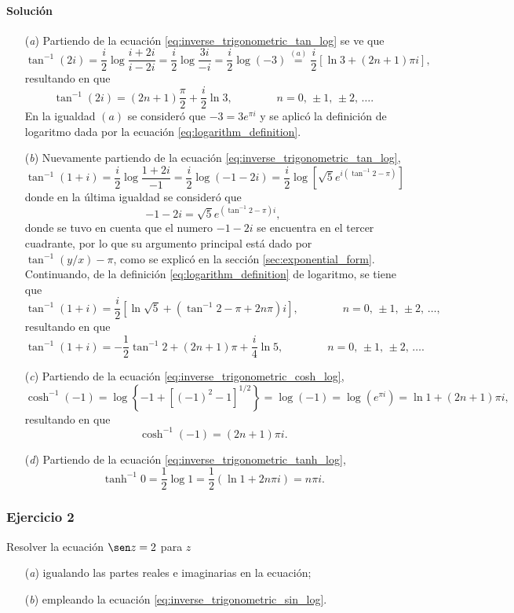\documentclass[a4paper]{report}
\begin{document}
\paragraph{Solución} 
\begin{enumerate}
 \item[(\textit{a})] Partiendo de la ecuación \ref{eq:inverse_trigonometric_tan_log} se ve que 
 \[
  \tan^{-1}(2i)=\frac{i}{2}\log\frac{i+2i}{i-2i}=\frac{i}{2}\log\frac{3i}{-i}
  =\frac{i}{2}\log(-3)\overset{(a)}{=}\frac{i}{2}\left[\ln3+(2n+1)\pi i\right],
 \]
 resultando en que 
 \[
  \tan^{-1}(2i)=(2n+1)\frac{\pi}{2}+\frac{i}{2}\ln3,
  \qquad\qquad
  n=0,\,\pm1,\,\pm2,\,\dots.
 \]
 En la igualdad \((a)\) se consideró que \(-3=3e^{\pi i}\) y se aplicó la definición de logaritmo dada por la ecuación \ref{eq:logarithm_definition}.
 \item[(\textit{b})] Nuevamente partiendo de la ecuación \ref{eq:inverse_trigonometric_tan_log},
 \[
  \tan^{-1}(1+i)=\frac{i}{2}\log\frac{1+2i}{-1}=\frac{i}{2}\log(-1-2i)
  =\frac{i}{2}\log\left[\sqrt{5}e^{i(\tan^{-1}2-\pi)}\right]
 \]
 donde en la última igualdad se consideró que 
 \[
  -1-2i=\sqrt{5}e^{(\tan^{-1}2-\pi)i},
 \]
 donde se tuvo en cuenta que el numero \(-1-2i\) se encuentra en el tercer cuadrante, por lo que su argumento principal está dado por \(\tan^{-1}(y/x)-\pi\), como se explicó en la sección \ref{sec:exponential_form}. Continuando, de la definición \ref{eq:logarithm_definition} de logaritmo, se tiene que 
 \[
  \tan^{-1}(1+i)=\frac{i}{2}\left[\ln\sqrt{5}+(\tan^{-1}2-\pi+2n\pi)i\right],
  \qquad\qquad
  n=0,\,\pm1,\,\pm2,\,\dots,
 \]
 resultando en que 
 \[
  \tan^{-1}(1+i)=-\frac{1}{2}\tan^{-1}2+(2n+1)\pi+\frac{i}{4}\ln5,
  \qquad\qquad
  n=0,\,\pm1,\,\pm2,\,\dots.
 \]
 \item[(\textit{c})] Partiendo de la ecuación \ref{eq:inverse_trigonometric_cosh_log},
 \[
  \cosh^{-1}(-1)=\log\left\{-1+[(-1)^2-1]^{1/2}\right\}=\log(-1)
  =\log(e^{\pi i})=\ln1+(2n+1)\pi i,
 \]
 resultando en que 
 \[
  \cosh^{-1}(-1)=(2n+1)\pi i.
 \]
 \item[(\textit{d})] Partiendo de la ecuación \ref{eq:inverse_trigonometric_tanh_log},
 \[
  \tanh^{-1}0=\frac{1}{2}\log1=\frac{1}{2}\left(\ln1+2n\pi i\right)=n\pi i.
 \]
\end{enumerate}

\subsubsection{Ejercicio 2}

Resolver la ecuación \(\sen z=2\) para \(z\)
\begin{enumerate}
 \item[(\textit{a})] igualando las partes reales e imaginarias en la ecuación;
 \item[(\textit{b})] empleando la ecuación \ref{eq:inverse_trigonometric_sin_log}.
\end{enumerate}
\end{document}
